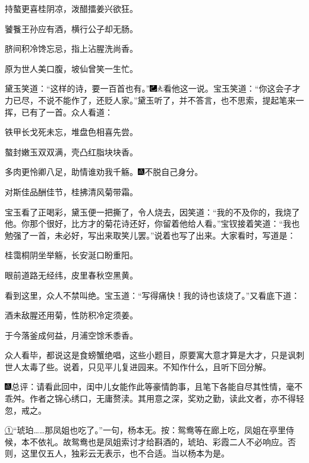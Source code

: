 持螯更喜桂阴凉，泼醋擂姜兴欲狂。

饕餮王孙应有酒，横行公子却无肠。

脐间积冷馋忘忌，指上沾腥洗尚香。

原为世人美口腹，坡仙曾笑一生忙。

黛玉笑道：``这样的诗，要一百首也有。''{\includegraphics[width=3mm]{../Images/00003}\includegraphics[width=3mm]{../Images/00012}\footnotesize \kaishu 看他这一说。}宝玉笑道：``你这会子才力已尽，不说不能作了，还贬人家。''黛玉听了，并不答言，也不思索，提起笔来一挥，已有了一首。众人看道：

铁甲长戈死未忘，堆盘色相喜先尝。

螯封嫩玉双双满，壳凸红脂块块香。

多肉更怜卿八足，助情谁劝我千觞。{\includegraphics[width=3mm]{../Images/00005}不脱自己身分。}

对斯佳品酬佳节，桂拂清风菊带霜。

宝玉看了正喝彩，黛玉便一把撕了，令人烧去，因笑道：``我的不及你的，我烧了他。你那个很好，比方才的菊花诗还好，你留着他给人看。''宝钗接着笑道：``我也勉强了一首，未必好，写出来取笑儿罢。''说着也写了出来。大家看时，写道是：

桂霭桐阴坐举觞，长安涎口盼重阳。

眼前道路无经纬，皮里春秋空黑黄。

看到这里，众人不禁叫绝。宝玉道：``写得痛快！我的诗也该烧了。''又看底下道：

酒未敌腥还用菊，性防积冷定须姜。

于今落釜成何益，月浦空馀禾黍香。

众人看毕，都说这是食螃蟹绝唱，这些小题目，原要寓大意才算是大才，只是讽刺世人太毒了些。说着，只见平儿复进园来。不知作什么，且听下回分解。

{\includegraphics[width=3mm]{../Images/00005}总评：请看此回中，闺中儿女能作此等豪情韵事，且笔下各能自尽其性情，毫不乖舛。作者之锦心绣口，无庸赘渎。其用意之深，奖劝之勤，读此文者，亦不得轻忽，戒之。}

{\href{../Text/part0042_split_000.html\#navto_1_a}{①}``琥珀\ldots{}\ldots{}那凤姐也吃了。''一句，杨本无。按：鸳鸯等在廊上吃，凤姐在亭里侍候，本不依礼。故鸳鸯也是凤姐索讨才给斟酒的，琥珀、彩霞二人不必响应。否则，这里仅五人，独彩云无表示，也不合适。当以杨本为是。}
